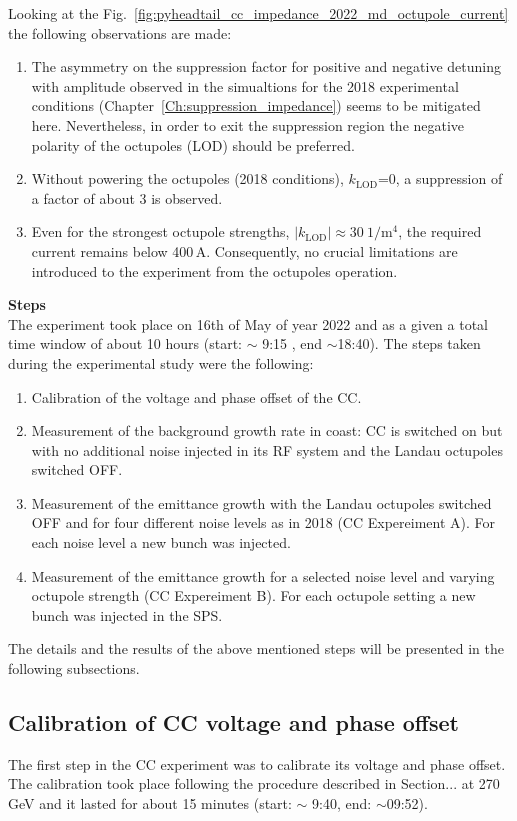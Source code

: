 Looking at the Fig.~\ref{fig:pyheadtail_cc_impedance_2022_md_octupole_current} the following observations are made:
\begin{enumerate}
   \item The asymmetry on the suppression factor for positive and negative detuning with amplitude observed in the simualtions for the 2018 experimental conditions (Chapter~\ref{Ch:suppression_impedance}) seems to be mitigated here. Nevertheless, in order to exit the suppression region the negative polarity of the octupoles (LOD) should be preferred.
   \item Without powering the octupoles (2018 conditions), $k_\mathrm{LOD}$=0, a suppression of a factor of about 3 is observed.
   \item Even for the strongest octupole strengths, $| k_\mathrm{LOD} |\approx 30 \ \mathrm{1/m^4}$, the required current remains below 400\,A. Consequently, no crucial limitations are introduced to the experiment from the octupoles operation.
\end{enumerate}

\textbf{Steps}\\
The experiment took place on 16th of May of year 2022 and as a given a total time window of about 10 hours (start: $\sim$ 9:15 , end $\sim$18:40). The steps taken during the experimental study were the following:

\begin{enumerate}
   \item Calibration of the voltage and phase offset of the CC.
   \item Measurement of the background growth rate in coast: CC is switched on but with no additional noise injected in its RF system and the Landau octupoles switched OFF.
   \item Measurement of the emittance growth with the Landau octupoles switched OFF and for four different noise levels as in 2018 (CC Expereiment A). For each noise level a new bunch was injected.
   \item Measurement of the emittance growth for a selected noise level and varying octupole strength (CC Expereiment B). For each octupole setting a new bunch was injected in the SPS.
\end{enumerate}


The details and the results of the above mentioned steps will be presented in the following subsections.

\subsection{Calibration of CC voltage and phase offset}\label{subsec:cc_calibration_2022}
The first step in the CC experiment was to calibrate its voltage and phase offset. The calibration took place following the procedure described in Section... at 270\,GeV and it lasted for about 15 minutes (start: $\sim$ 9:40, end: $\sim$09:52).

